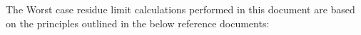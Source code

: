 The Worst case residue limit calculations performed in this document are based on the principles outlined in the below reference documents:\relax